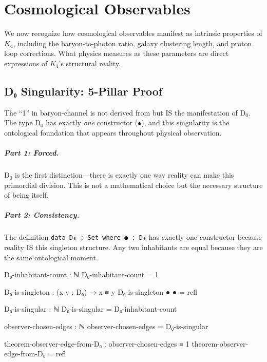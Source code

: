\documentclass[11pt,a4paper]{book}
\begin{document}

\chapter{Cosmological Observables}
\label{chap:cosmological-observables}

We now recognize how cosmological observables manifest as intrinsic properties of $K_4$, including the baryon-to-photon ratio, galaxy clustering length, and proton loop corrections. What physics measures as these parameters are direct expressions of $K_4$'s structural reality.

\section{D₀ Singularity: 5-Pillar Proof}

The ``1'' in baryon-channel is not derived from but IS the manifestation of D$_0$. The type D$_0$ has exactly \emph{one} constructor ($\bullet$), and this singularity is the ontological foundation that appears throughout physical observation.

\paragraph{Part 1: Forced.}
D$_0$ is the first distinction—there is exactly one way reality can make this primordial division. This is not a mathematical choice but the necessary structure of being itself.

\paragraph{Part 2: Consistency.}
The definition \texttt{data D₀ : Set where ● : D₀} has exactly one constructor because reality IS this singleton structure. Any two inhabitants are equal because they are the same ontological moment.

\begin{code}
D₀-inhabitant-count : ℕ
D₀-inhabitant-count = 1

D₀-is-singleton : (x y : D₀) → x ≡ y
D₀-is-singleton ● ● = refl

D₀-is-singular : ℕ
D₀-is-singular = D₀-inhabitant-count

observer-chosen-edges : ℕ
observer-chosen-edges = D₀-is-singular

theorem-observer-edge-from-D₀ : observer-chosen-edges ≡ 1
theorem-observer-edge-from-D₀ = refl
\end{code}
\end{document}
